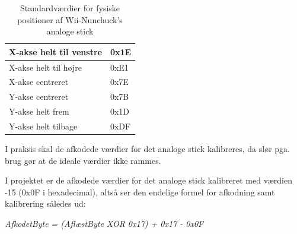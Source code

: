 \begin{table}[H]
	\centering
	\begin{tabular}{|l|l|}
		\hline
		X-akse helt til venstre & 0x1E \\ \hline
		X-akse helt til højre   & 0xE1 \\ \hline
		X-akse centreret        & 0x7E \\ \hline
		Y-akse centreret        & 0x7B \\ \hline
		Y-akse helt frem        & 0x1D \\ \hline
		Y-akse helt tilbage     & 0xDF \\ \hline
	\end{tabular}
	\caption{Standardværdier for fysiske positioner af Wii-Nunchuck's analoge stick}
	\label{tabel:WiiNunchuckStickPositioner}
\end{table}

I praksis skal de afkodede værdier for det analoge stick kalibreres, da slør pga. brug gør at de ideale værdier ikke rammes. 

I projektet er de afkodede værdier for det analoge stick kalibreret med værdien -15 (0x0F i hexadecimal), altså ser den endelige formel for afkodning samt kalibrering således ud:

\textit{AfkodetByte = (AflæstByte XOR 0x17) + 0x17 - 0x0F}